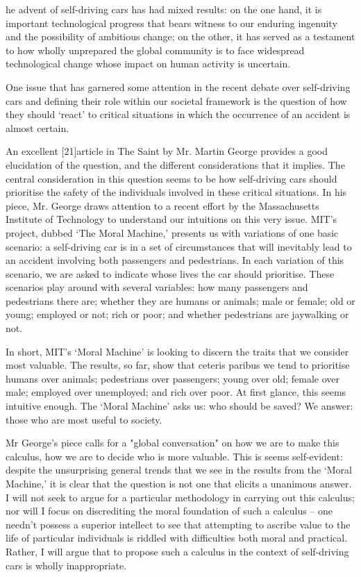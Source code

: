 \label{ch:the-ethics-of-self-driving-cars}

   he advent of self-driving cars has had mixed results: on the one hand,
   it is important technological progress that bears witness to our
   enduring ingenuity and the possibility of ambitious change; on the
   other, it has served as a testament to how wholly unprepared the global
   community is to face widespread technological change whose impact on
   human activity is uncertain.

   One issue that has garnered some attention in the recent debate over
   self-driving cars and defining their role within our societal framework
   is the question of how they should `react' to critical situations in
   which the occurrence of an accident is almost certain.

   An excellent [21]article in The Saint by Mr. Martin George provides a
   good elucidation of the question, and the different considerations that
   it implies. The central consideration in this question seems to be how
   self-driving cars should prioritise the safety of the individuals
   involved in these critical situations. In his piece, Mr. George draws
   attention to a recent effort by the Massachusetts Institute of
   Technology to understand our intuitions on this very issue. MIT's
   project, dubbed `The Moral Machine,' presents us with variations of one
   basic scenario: a self-driving car is in a set of circumstances that
   will inevitably lead to an accident involving both passengers and
   pedestrians. In each variation of this scenario, we are asked to
   indicate whose lives the car should prioritise. These scenarios play
   around with several variables: how many passengers and pedestrians
   there are; whether they are humans or animals; male or female; old or
   young; employed or not; rich or poor; and whether pedestrians are
   jaywalking or not.

   In short, MIT's `Moral Machine' is looking to discern the traits that
   we consider most valuable. The results, so far, show that ceteris
   paribus we tend to prioritise humans over animals; pedestrians over
   passengers; young over old; female over male; employed over unemployed;
   and rich over poor. At first glance, this seems intuitive enough. The
   `Moral Machine' asks us: who should be saved? We answer: those who are
   most useful to society.

   Mr George's piece calls for a "global conversation" on how we are to
   make this calculus, how we are to decide who is more valuable. This is
   seems self-evident: despite the unsurprising general trends that we see
   in the results from the `Moral Machine,' it is clear that the question
   is not one that elicits a unanimous answer. I will not seek to argue
   for a particular methodology in carrying out this calculus; nor will I
   focus on discrediting the moral foundation of such a calculus -- one
   needn't possess a superior intellect to see that attempting to ascribe
   value to the life of particular individuals is riddled with
   difficulties both moral and practical. Rather, I will argue that to
   propose such a calculus in the context of self-driving cars is wholly
   inappropriate.

